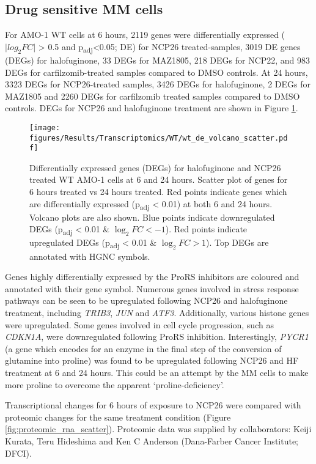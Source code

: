 \subsection{Drug sensitive MM cells}
For AMO-1 WT cells at 6 hours, 2119 genes were differentially expressed ($\lvert log_{2}FC \rvert$ > 0.5 and p\textsubscript{adj}<0.05; DE) for NCP26 treated-samples, 3019 DE genes (DEGs) for halofuginone, 33 DEGs for MAZ1805, 218 DEGs for NCP22, and 983 DEGs for carfilzomib-treated samples compared to DMSO controls.
At 24 hours, 3323 DEGs for NCP26-treated samples, 3426 DEGs for halofuginone, 2 DEGs for MAZ1805 and 2260 DEGs for carfilzomib treated samples compared to DMSO controls.
DEGs for NCP26 and halofuginone treatment are shown in Figure \ref{fig:wt_de}.
%
\begin{figure}[htb]
\centering
\texttt{[image: figures/Results/Transcriptomics/WT/wt\_de\_volcano\_scatter.pdf]}
\caption[Differentially expressed genes- WT cells]{Differentially expressed genes (DEGs) for halofuginone and NCP26 treated WT AMO-1 cells at 6 and 24 hours.
Scatter plot of genes for 6 hours treated vs 24 hours treated.
Red points indicate genes which are differentially expressed (p\textsubscript{adj} < 0.01) at both 6 and 24 hours.
Volcano plots are also shown.
Blue points indicate downregulated DEGs (p\textsubscript{adj} < 0.01 \& $\log_{2}FC < -1$).
Red points indicate upregulated DEGs (p\textsubscript{adj} < 0.01 \& $\log_{2}FC > 1$).
Top DEGs are annotated with HGNC symbols.
}
\label{fig:wt_de}
\end{figure}
Genes highly differentially expressed by the ProRS inhibitors are coloured and annotated with their gene symbol.
Numerous genes involved in stress response pathways can be seen to be upregulated following NCP26 and halofuginone treatment, including \textit{TRIB3}, \textit{JUN} and \textit{ATF3}.
Additionally, various histone genes were upregulated.
Some genes involved in cell cycle progression, such as \textit{CDKN1A}, were downregulated following ProRS inhibition.
Interestingly, \textit{PYCR1} (a gene which encodes for an enzyme in the final step of the conversion of glutamine into proline) was found to be upregulated following NCP26 and HF treatment at 6 and 24 hours.
This could be an attempt by the MM cells to make more proline to overcome the apparent `proline-deficiency'.

Transcriptional changes for 6 hours of exposure to NCP26 were compared with proteomic changes for the same treatment condition (Figure \ref{fig:proteomic_rna_scatter}).
Proteomic data was supplied by collaborators: Keiji Kurata, Teru Hideshima and Ken C Anderson (Dana-Farber Cancer Institute; DFCI).


